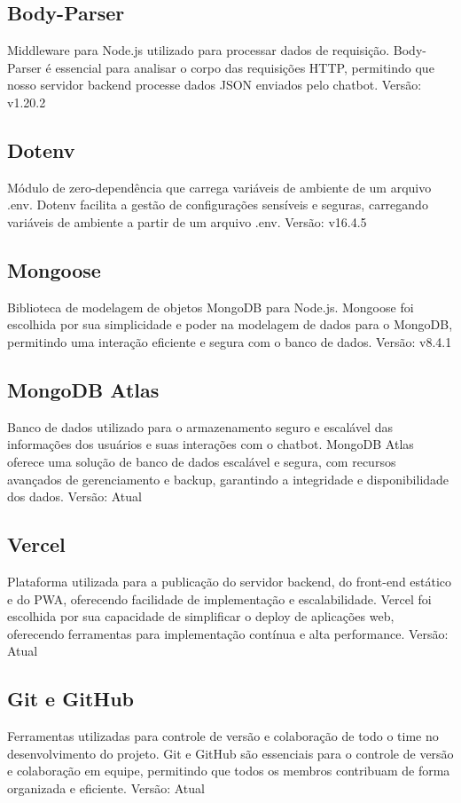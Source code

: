 \documentclass[12pt,a4paper]{article} %
\begin{document}
\subsection{Body-Parser}
Middleware para Node.js utilizado para processar dados de requisição. Body-Parser é essencial para analisar o corpo das requisições HTTP, permitindo que nosso servidor backend processe dados JSON enviados pelo chatbot. Versão: v1.20.2

\subsection{Dotenv}
Módulo de zero-dependência que carrega variáveis de ambiente de um arquivo .env. Dotenv facilita a gestão de configurações sensíveis e seguras, carregando variáveis de ambiente a partir de um arquivo .env. Versão: v16.4.5

\subsection{Mongoose}
Biblioteca de modelagem de objetos MongoDB para Node.js. Mongoose foi escolhida por sua simplicidade e poder na modelagem de dados para o MongoDB, permitindo uma interação eficiente e segura com o banco de dados. Versão: v8.4.1

\subsection{MongoDB Atlas}
Banco de dados utilizado para o armazenamento seguro e escalável das informações dos usuários e suas interações com o chatbot. MongoDB Atlas oferece uma solução de banco de dados escalável e segura, com recursos avançados de gerenciamento e backup, garantindo a integridade e disponibilidade dos dados. Versão: Atual

\subsection{Vercel}
Plataforma utilizada para a publicação do servidor backend, do front-end estático e do PWA, oferecendo facilidade de implementação e escalabilidade. Vercel foi escolhida por sua capacidade de simplificar o deploy de aplicações web, oferecendo ferramentas para implementação contínua e alta performance. Versão: Atual

\subsection{Git e GitHub}
Ferramentas utilizadas para controle de versão e colaboração de todo o time no desenvolvimento do projeto. Git e GitHub são essenciais para o controle de versão e colaboração em equipe, permitindo que todos os membros contribuam de forma organizada e eficiente. Versão: Atual
\end{document}
